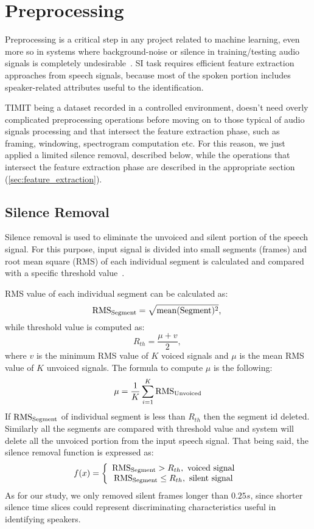 \section{Preprocessing}\label{sec:preprocessing}
Preprocessing is a critical step in any project related to machine learning, even more so in systems where background-noise or silence in training/testing audio signals is completely undesirable~\cite{jahangir:review}. SI task requires efficient feature extraction approaches from speech signals, because most of the spoken portion includes speaker-related attributes useful to the identification.

TIMIT being a dataset recorded in a controlled environment, doesn't need overly complicated preprocessing operations before moving on to those typical of audio signals processing and that intersect the feature extraction phase, such as framing, windowing, spectrogram computation etc. For this reason, we just applied a limited silence removal, described below, while the operations that intersect the feature extraction phase are described in the appropriate section (\vref{sec:feature_extraction}).

\subsection{Silence Removal}
Silence removal is used to eliminate the unvoiced and silent portion of the speech signal. 
For this purpose, input signal is divided into small segments (frames) and root mean square 
(RMS) of each individual segment is calculated and compared with a specific threshold value~\cite{asadullah:silence_removal}.

RMS value of each individual segment can be calculated as:
$$
\operatorname{RMS}_{\operatorname{Segment}}=\sqrt{\operatorname{mean}(\operatorname{Segment})^{2}} \text{, }
$$
while threshold value is computed as:
$$
R_{t h}=\frac{\mu+v}{2} \text{, }
$$
where $v$ is the minimum RMS value of $K$ voiced signals and $\mu$ is the mean RMS value of $K$ unvoiced signals. The formula to compute $\mu$ is the following:
$$
\mu=\frac{1}{K} \sum_{i=1}^{K} \operatorname{RMS}_{\text{Unvoiced}}
$$
If $\operatorname{RMS}_{\operatorname{Segment}}$ of individual segment is less than $R_{th}$ then the segment id deleted. Similarly all the segments are compared with threshold value and system will delete all the unvoiced portion from the input speech signal. That being said, the silence removal function is expressed as:
$$
f(x)=\left\{\begin{array}{c}
	\operatorname{RMS}_{\operatorname{Segment}} > R_{t h}, \text { voiced signal }\\
	\operatorname{RMS}_{\operatorname{Segment}} \leq R_{t h}, \text { silent signal }
\end{array}\right.
$$
As for our study, we only removed silent frames longer than $0.25s$, since shorter silence time slices could represent discriminating characteristics useful in identifying speakers.

